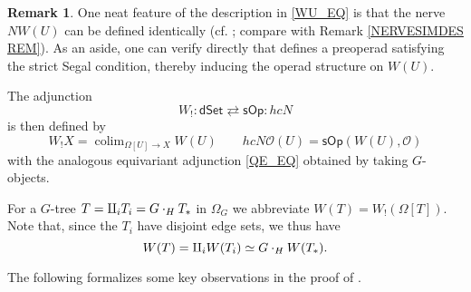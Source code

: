 \documentclass[a4paper,10pt
,draft
]{article}%
\numberwithin{equation}{section}
\numberwithin{figure}{section}
\theoremstyle{definition} %
\newtheorem{remark}[equation]{Remark}%
\newcommand{\sOp}{\ensuremath{\mathsf{sOp}}}%
\newcommand{\dSet}{\mathsf{dSet}}
\DeclareMathOperator{\colim}{colim}%
\renewcommand{\O}{\ensuremath{\mathcal O}}
\newcommand{\1}{\ensuremath{\mathbbm 1}}%
\begin{document}
\begin{remark}
	One neat feature of the description in 
	\eqref{WU_EQ}
	is that the nerve $N W(U)$
	can be defined identically 
	(cf. {\color{red} \cite[Def. \ref{W-NWTNS DEF}]{BP_WCONS}}; 
	compare with Remark \ref{NERVESIMDES REM}).
	As an aside, one can verify directly that
	{\color{red} \cite[Def. \ref{W-NWTNS DEF}]{BP_WCONS}}
	defines a preoperad satisfying the strict Segal condition,
	thereby inducing the operad structure on $W(U)$.
\end{remark}



The adjunction
\begin{equation} \label{SOPDSET_EQ}
	W_! \colon \dSet \rightleftarrows \sOp \colon h c N           
\end{equation}
is then defined by
\[
	W_!X = \colim_{\Omega[U] \to X}W(U)
	\qquad
	hcN\O(U) = \sOp(W(U), \O)
\]
with the analogous equivariant adjunction \eqref{QE_EQ}
obtained by taking $G$-objects.


For a $G$-tree 
$T = \amalg_i T_i = G \cdot_H T_{\**}$
in $\Omega_G$
we abbreviate
$W(T) = W_!(\Omega[T])$.
Note that, since the $T_i$ have disjoint edge sets, we thus have
\[
	W(T) = \amalg_i W(T_i) \simeq G \cdot_H W(T_{\**}).
\]


The following formalizes some key observations in the proof of
\cite[Prop. 4.5]{CM13b}.
\end{document}
